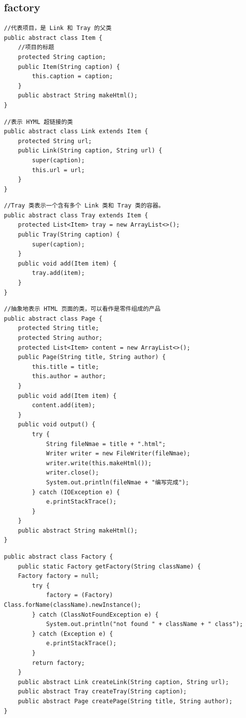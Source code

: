 \subsection{factory}
\begin{lstlisting}
//代表项目，是 Link 和 Tray 的父类
public abstract class Item {
	//项目的标题
	protected String caption;
	public Item(String caption) {
		this.caption = caption;
	}
	public abstract String makeHtml();
}
\end{lstlisting}
\begin{lstlisting}
//表示 HYML 超链接的类
public abstract class Link extends Item {
	protected String url;
	public Link(String caption, String url) {
		super(caption);
		this.url = url;
	}
}
\end{lstlisting}
\begin{lstlisting}
//Tray 类表示一个含有多个 Link 类和 Tray 类的容器。
public abstract class Tray extends Item {
	protected List<Item> tray = new ArrayList<>();
	public Tray(String caption) {
		super(caption);
	}
	public void add(Item item) {
		tray.add(item);
	}
}
\end{lstlisting}
\begin{lstlisting}
//抽象地表示 HTML 页面的类，可以看作是零件组成的产品
public abstract class Page {
	protected String title;
	protected String author;
	protected List<Item> content = new ArrayList<>();
	public Page(String title, String author) {
		this.title = title;
		this.author = author;
	}
	public void add(Item item) {
		content.add(item);
	}
	public void output() {
		try {
			String fileNmae = title + ".html";
			Writer writer = new FileWriter(fileNmae);
			writer.write(this.makeHtml());
			writer.close();
			System.out.println(fileNmae + "编写完成");
		} catch (IOException e) {
			e.printStackTrace();
		}
	}
	public abstract String makeHtml();
}
\end{lstlisting}
\begin{lstlisting}
public abstract class Factory {
	public static Factory getFactory(String className) {
	Factory factory = null;
		try {
			factory = (Factory) Class.forName(className).newInstance();
		} catch (ClassNotFoundException e) {
			System.out.println("not found " + className + " class");
		} catch (Exception e) {
			e.printStackTrace();
		}
		return factory;
	}
	public abstract Link createLink(String caption, String url);
	public abstract Tray createTray(String caption);
	public abstract Page createPage(String title, String author);
}
\end{lstlisting}

